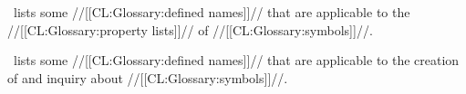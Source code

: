 

\Thenextfigure\ lists some
//[[CL:Glossary:defined names]]// that are applicable to the //[[CL:Glossary:property lists]]// of //[[CL:Glossary:symbols]]//.

                    
\Thenextfigure\ lists some //[[CL:Glossary:defined names]]// that are applicable 
to the creation of and inquiry about //[[CL:Glossary:symbols]]//.


